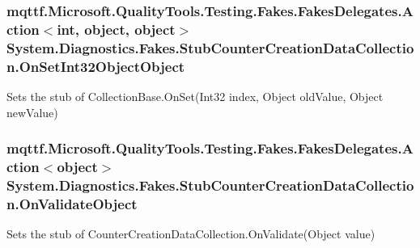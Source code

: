 \hypertarget{class_system_1_1_diagnostics_1_1_fakes_1_1_stub_counter_creation_data_collection_a60e22ee186abfcd9d5ca43776578bba0}{
\subsubsection[{On\-Set\-Int32\-Object\-Object}]{\setlength{\rightskip}{0pt plus 5cm}mqttf.\-Microsoft.\-Quality\-Tools.\-Testing.\-Fakes.\-Fakes\-Delegates.\-Action$<$int, object, object$>$ System.\-Diagnostics.\-Fakes.\-Stub\-Counter\-Creation\-Data\-Collection.\-On\-Set\-Int32\-Object\-Object}}\label{class_system_1_1_diagnostics_1_1_fakes_1_1_stub_counter_creation_data_collection_a60e22ee186abfcd9d5ca43776578bba0}


Sets the stub of Collection\-Base.\-On\-Set(\-Int32 index, Object old\-Value, Object new\-Value)

\hypertarget{class_system_1_1_diagnostics_1_1_fakes_1_1_stub_counter_creation_data_collection_afd6dfd0f56ae139dabe9c9c21a87f2f9}{
\subsubsection[{On\-Validate\-Object}]{\setlength{\rightskip}{0pt plus 5cm}mqttf.\-Microsoft.\-Quality\-Tools.\-Testing.\-Fakes.\-Fakes\-Delegates.\-Action$<$object$>$ System.\-Diagnostics.\-Fakes.\-Stub\-Counter\-Creation\-Data\-Collection.\-On\-Validate\-Object}}\label{class_system_1_1_diagnostics_1_1_fakes_1_1_stub_counter_creation_data_collection_afd6dfd0f56ae139dabe9c9c21a87f2f9}


Sets the stub of Counter\-Creation\-Data\-Collection.\-On\-Validate(\-Object value)

